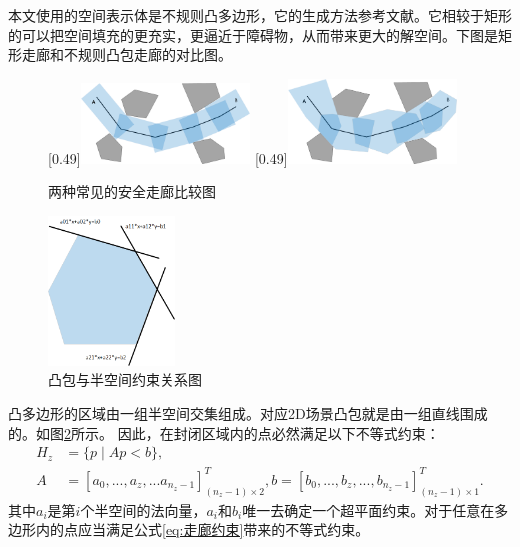 \documentclass[master,academic]{ysuthesis} %
\begin{document}
		本文使用的空间表示体是不规则凸多边形，它的生成方法参考文献\cite{SikangLiu:2017}。它相较于矩形的可以把空间填充的更充实，更逼近于障碍物，从而带来更大的解空间。下图是矩形走廊和不规则凸包走廊的对比图。
		\begin{figure}[!ht]
			\centering
			[0.49\textwidth]{\includegraphics[width=0.4\textwidth]{安全走廊比较矩形1.png}}
			[0.49\textwidth]{\includegraphics[width=0.4\textwidth]{安全走廊比较多边形2.png}}
			\caption{两种常见的安全走廊比较图}
			\label{安全走廊比较}
		\end{figure}
		\begin{figure}[!ht]
			\centering
			\includegraphics[width=0.3\textwidth]{凸包矩阵.png}
			\caption{凸包与半空间约束关系图}
			\label{fig:凸包矩阵}
		\end{figure}
		
		凸多边形的区域由一组半空间交集组成。对应2D场景凸包就是由一组直线围成的。如图\ref{fig:凸包矩阵}所示。
		因此，在封闭区域内的点必然满足以下不等式约束：
		\begin{equation}
			\begin{aligned}
				H_z&=\{p\mid Ap<b\},\\
				A&=\left[ a_0,...,a_z,...a_{n_z-1} \right]^T_{(n_z-1)\times 2},b=\left[ b_0,...,b_z,...,b_{n_z-1} \right]^T_{(n_z-1)\times 1}.
			\end{aligned}
			\label{eq:走廊约束}
		\end{equation}
		其中$a_i$是第$i$个半空间的法向量，$a_i$和$b_i$唯一去确定一个超平面约束。对于任意在多边形内的点应当满足公式\ref{eq:走廊约束}带来的不等式约束。
	
\end{document}
